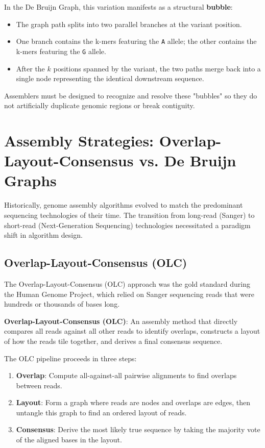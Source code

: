 In the De Bruijn Graph, this variation manifests as a structural \textbf{bubble}:
\begin{itemize}
    \item The graph path splits into two parallel branches at the variant position.
    \item One branch contains the k-mers featuring the \texttt{A} allele; the other contains the k-mers featuring the \texttt{G} allele.
    \item After the $k$ positions spanned by the variant, the two paths merge back into a single node representing the identical downstream sequence.
\end{itemize}
\sta Assemblers must be designed to recognize and resolve these "bubbles" so they do not artificially duplicate genomic regions or break contiguity.

\section{Assembly Strategies: Overlap-Layout-Consensus vs. De Bruijn Graphs}
Historically, genome assembly algorithms evolved to match the predominant sequencing technologies of their time. The transition from long-read (Sanger) to short-read (Next-Generation Sequencing) technologies necessitated a paradigm shift in algorithm design.

\subsection{Overlap-Layout-Consensus (OLC)}
The Overlap-Layout-Consensus (OLC) approach was the gold standard during the Human Genome Project, which relied on Sanger sequencing reads that were hundreds or thousands of bases long.

\begin{important}
    \textbf{Overlap-Layout-Consensus (OLC)}: An assembly method that directly compares all reads against all other reads to identify overlaps, constructs a layout of how the reads tile together, and derives a final consensus sequence.
\end{important}

The OLC pipeline proceeds in three steps:
\begin{enumerate}
    \item \textbf{Overlap}: Compute all-against-all pairwise alignments to find overlaps between reads.
    \item \textbf{Layout}: Form a graph where reads are nodes and overlaps are edges, then untangle this graph to find an ordered layout of reads.
    \item \textbf{Consensus}: Derive the most likely true sequence by taking the majority vote of the aligned bases in the layout.
\end{enumerate}

